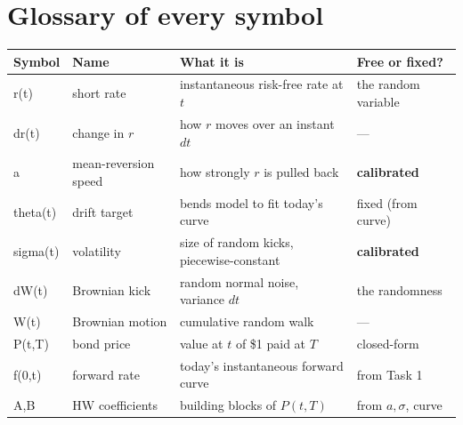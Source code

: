 \documentclass[11pt]{article}
\begin{document}
\section{Glossary of every symbol}
\renewcommand{\arraystretch}{1.3}
\begin{center}
\begin{tabular}{>{\ttfamily}l l p{6.2cm} l}
\toprule
\normalfont Symbol & Name & What it is & Free or fixed? \\
\midrule
r(t)         & short rate            & instantaneous risk-free rate at $t$           & the random variable \\
dr(t)        & change in $r$         & how $r$ moves over an instant $dt$            & --- \\
a            & mean-reversion speed  & how strongly $r$ is pulled back               & \textbf{calibrated} \\
theta(t)     & drift target          & bends model to fit today's curve              & fixed (from curve) \\
sigma(t)     & volatility            & size of random kicks, piecewise-constant      & \textbf{calibrated} \\
dW(t)        & Brownian kick         & random normal noise, variance $dt$            & the randomness \\
W(t)         & Brownian motion       & cumulative random walk                        & --- \\
P(t,T)       & bond price            & value at $t$ of \$1 paid at $T$               & closed-form \\
f(0,t)       & forward rate          & today's instantaneous forward curve           & from Task 1 \\
A,B          & HW coefficients       & building blocks of $P(t,T)$                   & from $a,\sigma$, curve \\
\bottomrule
\end{tabular}
\end{center}
\end{document}
